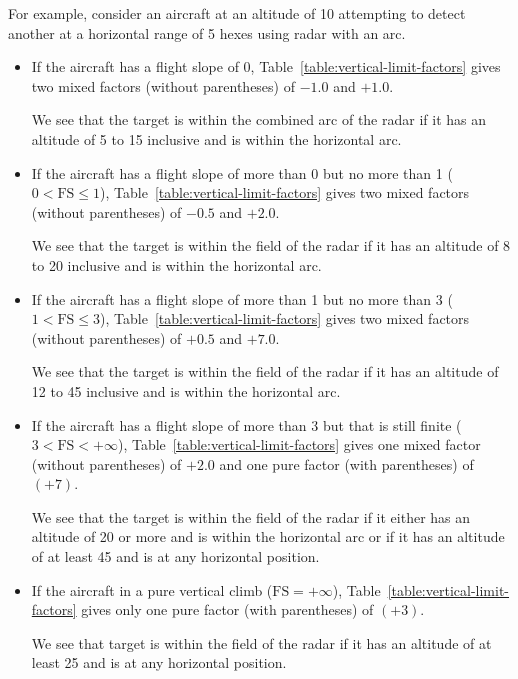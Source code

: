 {For example, consider an aircraft at an altitude of 10 attempting to detect another at a horizontal range of 5 hexes using radar with an  arc.
\begin{itemize}
\item
If the aircraft has a flight slope of 0, Table~\ref{table:vertical-limit-factors} gives two mixed factors (without parentheses) of $-1.0$ and $+1.0$. 

We see that the target is within the combined arc of the radar if it has an altitude of 5 to 15 inclusive and is within the  horizontal arc.

\item
If the aircraft has a flight slope of more than 0 but no more than 1 ($0 < \mbox{FS} \le 1$), Table~\ref{table:vertical-limit-factors} gives two mixed factors (without parentheses) of $-0.5$ and $+2.0$. 

We see that the target is within the field of the radar if it has an altitude of 8 to 20 inclusive and is within the  horizontal arc.

\item
If the aircraft has a flight slope of more than 1 but no more than 3 ($1 < \mbox{FS} \le 3$), Table~\ref{table:vertical-limit-factors} gives two mixed factors (without parentheses) of $+0.5$ and $+7.0$. 

We see that the target is within the field of the radar if it has an altitude of 12 to 45 inclusive and is within the  horizontal arc.

\item
If the aircraft has a flight slope of more than 3 but that is still finite ($3 < \mbox{FS} < +\infty$), Table~\ref{table:vertical-limit-factors} gives one mixed factor (without parentheses) of $+2.0$ and one pure factor (with parentheses) of $(+7)$.

We see that the target is within the field of the radar if it either has an altitude of 20 or more and is within the  horizontal arc or if it has an altitude of at least 45 and is at any horizontal position.

\item
If the aircraft in a pure vertical climb ($\mbox{FS} = +\infty$), Table~\ref{table:vertical-limit-factors} gives only one pure factor (with parentheses) of $(+3)$.

We see that target is within the field of the radar if it has an altitude of at least 25 and is at any horizontal position.

\end{itemize}



}

